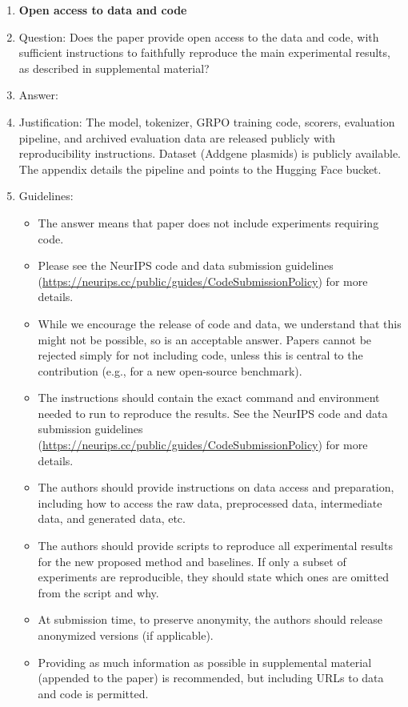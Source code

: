 \begin{enumerate}
\item {\bf Open access to data and code}
    \item[] Question: Does the paper provide open access to the data and code, with sufficient instructions to faithfully reproduce the main experimental results, as described in supplemental material?
    \item[] Answer: \answerYes{}
    \item[] Justification: The model, tokenizer, GRPO training code, scorers, evaluation pipeline, and archived evaluation data are released publicly with reproducibility instructions. Dataset (Addgene plasmids) is publicly available. The appendix details the pipeline and points to the Hugging Face bucket.
    \item[] Guidelines:
    \begin{itemize}
        \item The answer \answerNA{} means that paper does not include experiments requiring code.
        \item Please see the NeurIPS code and data submission guidelines (\url{https://neurips.cc/public/guides/CodeSubmissionPolicy}) for more details.
        \item While we encourage the release of code and data, we understand that this might not be possible, so \answerNo{} is an acceptable answer. Papers cannot be rejected simply for not including code, unless this is central to the contribution (e.g., for a new open-source benchmark).
        \item The instructions should contain the exact command and environment needed to run to reproduce the results. See the NeurIPS code and data submission guidelines (\url{https://neurips.cc/public/guides/CodeSubmissionPolicy}) for more details.
        \item The authors should provide instructions on data access and preparation, including how to access the raw data, preprocessed data, intermediate data, and generated data, etc.
        \item The authors should provide scripts to reproduce all experimental results for the new proposed method and baselines. If only a subset of experiments are reproducible, they should state which ones are omitted from the script and why.
        \item At submission time, to preserve anonymity, the authors should release anonymized versions (if applicable).
        \item Providing as much information as possible in supplemental material (appended to the paper) is recommended, but including URLs to data and code is permitted.
    \end{itemize}



\end{enumerate}
